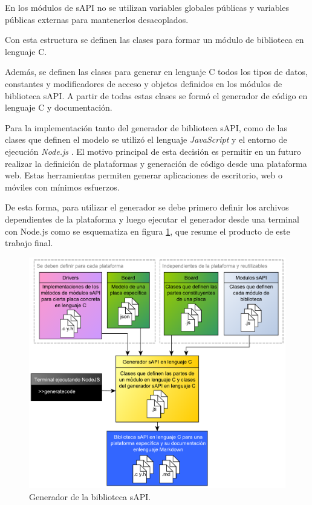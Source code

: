 En los módulos de sAPI no se utilizan variables globales públicas y variables públicas externas para mantenerlos desacoplados.

Con esta estructura se definen las clases para formar un módulo de biblioteca en lenguaje C.

Además, se definen las clases para generar en lenguaje C todos los tipos de datos, constantes y modificadores de acceso y objetos definidos en los módulos de biblioteca sAPI. A partir de todas estas clases se formó el generador de código en lenguaje C y documentación.

Para la implementación tanto del generador de biblioteca sAPI, como de las clases que definen el modelo se utilizó el lenguaje \emph{JavaScript} \citep{JavaScript} y el entorno de ejecución \emph{Node.js} \citep{NodeJS}. El motivo principal de esta decisión es permitir en un futuro realizar la definición de plataformas y generación de código desde una plataforma web. Estas herramientas permiten generar aplicaciones de escritorio, web o móviles con mínimos esfuerzos.

De esta forma, para utilizar el generador se debe primero definir los archivos dependientes de la plataforma y luego ejecutar el generador desde una terminal con Node.js como se esquematiza en figura \ref{fig:fullSapiGen}, que resume el producto de este trabajo final.

\begin{figure}[!htbp]
\begin{center}  %
\includegraphics*[width=14.5cm]{Figures/sapi_gen2.pdf}
\par\caption{Generador de la biblioteca sAPI.}\label{fig:fullSapiGen}
\end{center}
\end{figure}

